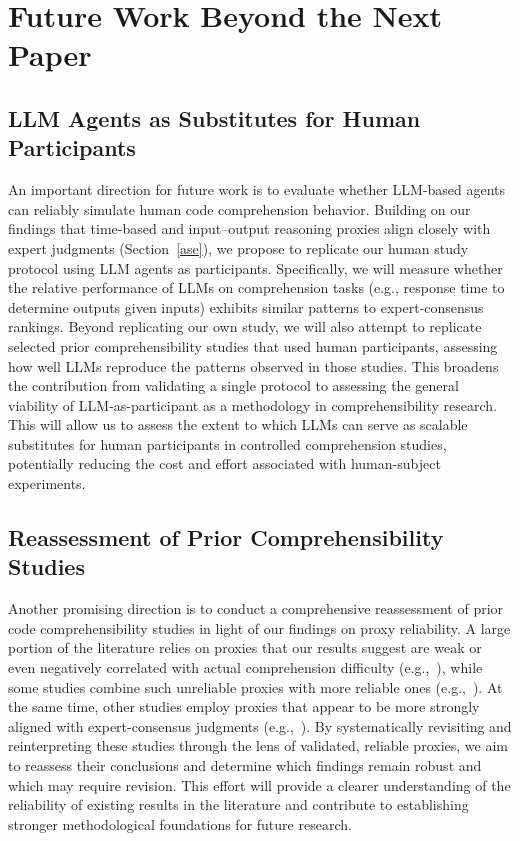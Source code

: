 \section{Future Work Beyond the Next Paper}
\label{sec:futurework}

\subsection{LLM Agents as Substitutes for Human Participants}

An important direction for future work is to evaluate whether LLM-based agents can reliably simulate human code comprehension behavior. Building on our findings that time-based and input--output reasoning proxies align closely with expert judgments (Section~\ref{ase}), we propose to replicate our human study protocol using LLM agents as participants. Specifically, we will measure whether the relative performance of LLMs on comprehension tasks (e.g., response time to determine outputs given inputs) exhibits similar patterns to expert-consensus rankings. Beyond replicating our own study, we will also attempt to replicate selected prior comprehensibility studies that used human participants, assessing how well LLMs reproduce the patterns observed in those studies. This broadens the contribution from validating a single protocol to assessing the general viability of LLM-as-participant as a methodology in comprehensibility research. This will allow us to assess the extent to which LLMs can serve as scalable substitutes for human participants in controlled comprehension studies, potentially reducing the cost and effort associated with human-subject experiments.

\subsection{Reassessment of Prior Comprehensibility Studies}

Another promising direction is to conduct a comprehensive reassessment of prior code comprehensibility studies in light of our findings on proxy reliability. A large portion of the literature relies on proxies that our results suggest are weak or even negatively correlated with actual comprehension difficulty (e.g.,~\cite{Wyrich:ACS23,33-29,33-4}), while some studies combine such unreliable proxies with more reliable ones (e.g.,~\cite{33-15,penningtonModel,S75,S4}). At the same time, other studies employ proxies that appear to be more strongly aligned with expert-consensus judgments (e.g.,~\cite{S39,S48,S50,S57,S59,S60}). By systematically revisiting and reinterpreting these studies through the lens of validated, reliable proxies, we aim to reassess their conclusions and determine which findings remain robust and which may require revision. This effort will provide a clearer understanding of the reliability of existing results in the literature and contribute to establishing stronger methodological foundations for future research.

